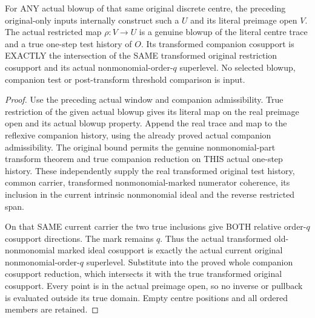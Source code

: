 \begin{theorem}
\label{hir:original-discrete-positive-same-blowup-companion-test}
\leanok
For ANY actual blowup of that same original discrete centre, the preceding
original-only inputs internally construct such a $U$ and its literal
preimage open $V$. The actual restricted map $\rho:V\to U$ is a genuine
blowup of the literal centre trace and a true one-step test history of
$O$. Its transformed companion cosupport is EXACTLY the intersection of
the SAME transformed original restriction cosupport and its actual
nonmonomial-order-$q$ superlevel. No selected blowup, companion test or
post-transform threshold comparison is input.
\end{theorem}
\begin{proof}
Use the preceding actual window and companion admissibility. True
restriction of the given actual blowup gives its literal map on the real
preimage open and its actual blowup property. Append the real trace and
map to the reflexive companion history, using the already proved actual
companion admissibility. The original bound permits the genuine
nonmonomial-part transform theorem and true companion reduction on THIS
actual one-step history. These independently supply the real transformed
original test history, common carrier, transformed nonmonomial-marked
numerator coherence, its inclusion in the current intrinsic nonmonomial
ideal and the reverse restricted span.

On that SAME current carrier the two true inclusions give BOTH relative
order-$q$ cosupport directions. The mark remains $q$. Thus the actual
transformed old-nonmonomial marked ideal cosupport is exactly the actual
current original nonmonomial-order-$q$ superlevel. Substitute into the
proved whole companion cosupport reduction, which intersects it with the
true transformed original cosupport. Every point is in the actual
preimage open, so no inverse or pullback is evaluated outside its true
domain. Empty centre positions and all ordered members are retained.
\end{proof}

